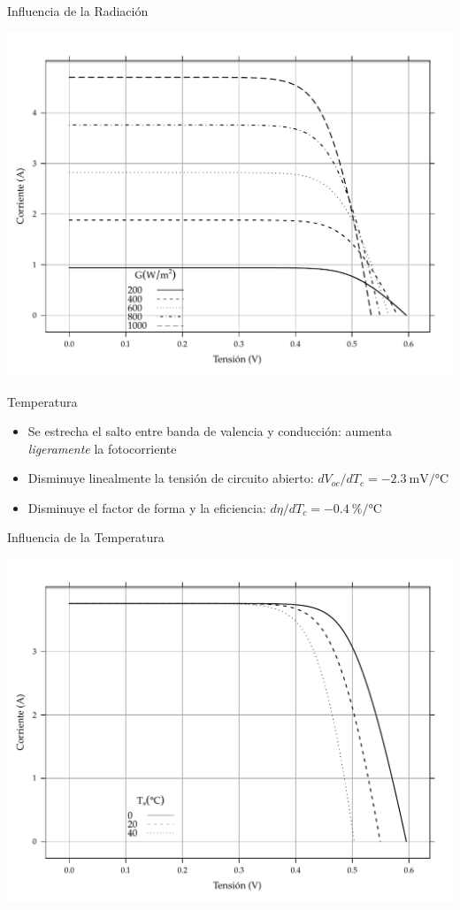 \documentclass[xcolor={usenames,svgnames,dvipsnames}]{beamer}
\begin{document}
\begin{frame}[label={sec:org0beda46}]{Influencia de la Radiación}
\begin{center}
\includegraphics[width=.9\linewidth]{../figs/CurvaIV_Ta20.pdf}
\end{center}
\end{frame}

\begin{frame}[label={sec:org84d469b}]{Temperatura}
\begin{itemize}
\item Se estrecha el salto entre banda de valencia y conducción: aumenta \emph{ligeramente} la fotocorriente

\item \alert{Disminuye linealmente la tensión de circuito abierto}: \(dV_{oc}/dT_{c}=\SI{-2.3}{\milli\volt\per\celsius}\)

\item Disminuye el factor de forma y la eficiencia:
\(d\eta/dT_{c}=\SI{-0.4}{\percent\per\celsius}\)
\end{itemize}
\end{frame}

\begin{frame}[label={sec:orge8d2dbf}]{Influencia de la Temperatura}
\begin{center}
\includegraphics[width=.9\linewidth]{../figs/CurvaIV_G800.pdf}
\end{center}
\end{frame}
\end{document}
